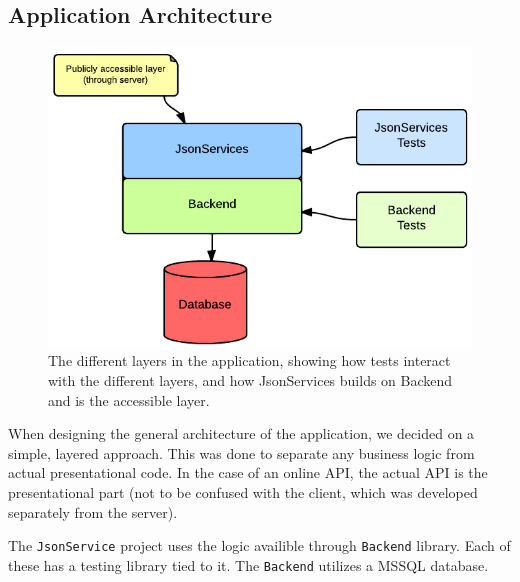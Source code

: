 \subsection{Application Architecture}

\begin{figure}[h]
	\centering
	\includegraphics[scale=0.5]{./p1design/layers.png}
	\caption{The different layers in the application, showing how tests interact with
        the different layers, and how JsonServices builds on Backend and is the accessible
        layer.}
	\label{fig:layers}
\end{figure}

When designing the general architecture of the application, we decided on a simple, layered approach.
This was done to separate any business logic from actual presentational code. In the case of an online
API, the actual API is the presentational part (not to be confused with the client, which was developed
separately from the server).

The \verb+JsonService+ project uses the logic availible through \verb+Backend+ library. Each of these has
a testing library tied to it. The \verb+Backend+ utilizes a MSSQL database.